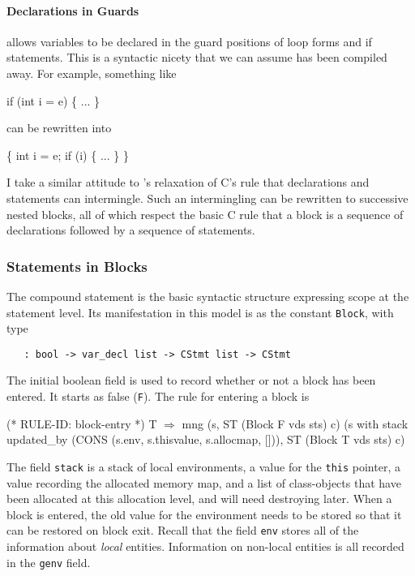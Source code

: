 \documentclass[11pt]{article}
\begin{document}
\paragraph{Declarations in Guards}
\cpp{} allows variables to be declared in the guard positions of loop
forms and if statements.  This is a syntactic nicety that we can assume
has been compiled away.  For example, something like
\begin{stdrule}
   if (int i = e) \{ ... \}
\end{stdrule}
can be rewritten into
\begin{stdrule}
   \{ int i = e; if (i) \{ ... \} \}
\end{stdrule}
I take a similar attitude to \cpp's relaxation of C's rule that
declarations and statements can intermingle.  Such an intermingling
can be rewritten to successive nested blocks, all of which respect the
basic C rule that a block is a sequence of declarations followed by a
sequence of statements.

\subsubsection{Statements in Blocks}
\label{sec:statements-blocks}

The compound statement is the basic syntactic structure expressing
scope at the statement level.  Its manifestation in this model is as
the constant \texttt{Block}, with type
\begin{verbatim}
   : bool -> var_decl list -> CStmt list -> CStmt
\end{verbatim}
The initial boolean field is used to record whether or not a block has
been entered.  It starts as false (\texttt{F}).  The rule for entering
a block is%
%
\begin{stdrule}
(* RULE-ID: block-entry *)
     T
   \(\Rightarrow\)
     mng (s, ST (Block F vds sts) c)
         (s with stack updated_by
                       (CONS (s.env, s.thisvalue, s.allocmap, [])),
          ST (Block T vds sts) c)
\end{stdrule}
%
%
The field \texttt{stack} is a stack of local environments, a value for
the \texttt{this} pointer, a value recording the allocated memory map,
and a list of class-objects that have been allocated at this
allocation level, and will need destroying later.  When a block is
entered, the old value for the environment needs to be stored so that
it can be restored on block exit.  Recall that the field \texttt{env}
stores all of the information about \emph{local} entities.
Information on non-local entities is all recorded in the \texttt{genv}
field.
\end{document}
